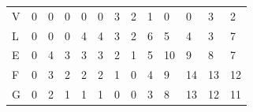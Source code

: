 \documentclass{bredelebeamer}
\begin{document}
\begin{frame}
\begin{table}[]
\begin{tabular}{lllllllllllll}
\multicolumn{1}{l|}{V}  & \multicolumn{1}{l|}{0} & \multicolumn{1}{l|}{0} & \multicolumn{1}{l|}{0} & \multicolumn{1}{l|}{0} & \multicolumn{1}{l|}{0}                         & \multicolumn{1}{l|}{\cellcolor[HTML]{EFEFEF}3} & \multicolumn{1}{l|}{\cellcolor[HTML]{3166FF}2} & \multicolumn{1}{l|}{1}                         & \multicolumn{1}{l|}{0}                          & \multicolumn{1}{l|}{0}                          & \multicolumn{1}{l|}{3}  & \multicolumn{1}{l|}{2}  \\ \cline{2-13} 
\multicolumn{1}{l|}{L}  & \multicolumn{1}{l|}{0} & \multicolumn{1}{l|}{0} & \multicolumn{1}{l|}{0} & \multicolumn{1}{l|}{4} & \multicolumn{1}{l|}{4}                         & \multicolumn{1}{l|}{3}                         & \multicolumn{1}{l|}{2}                         & \multicolumn{1}{l|}{\cellcolor[HTML]{3166FF}6} & \multicolumn{1}{l|}{5}                          & \multicolumn{1}{l|}{4}                          & \multicolumn{1}{l|}{3}  & \multicolumn{1}{l|}{7}  \\ \cline{2-13} 
\multicolumn{1}{l|}{E}  & \multicolumn{1}{l|}{0} & \multicolumn{1}{l|}{4} & \multicolumn{1}{l|}{3} & \multicolumn{1}{l|}{3} & \multicolumn{1}{l|}{3}                         & \multicolumn{1}{l|}{2}                         & \multicolumn{1}{l|}{1}                         & \multicolumn{1}{l|}{5}                         & \multicolumn{1}{l|}{\cellcolor[HTML]{3166FF}10} & \multicolumn{1}{l|}{9}                          & \multicolumn{1}{l|}{8}  & \multicolumn{1}{l|}{7}  \\ \cline{2-13} 
\multicolumn{1}{l|}{F}  & \multicolumn{1}{l|}{0} & \multicolumn{1}{l|}{3} & \multicolumn{1}{l|}{2} & \multicolumn{1}{l|}{2} & \multicolumn{1}{l|}{2}                         & \multicolumn{1}{l|}{1}                         & \multicolumn{1}{l|}{0}                         & \multicolumn{1}{l|}{4}                         & \multicolumn{1}{l|}{9}                          & \multicolumn{1}{l|}{\cellcolor[HTML]{3166FF}14} & \multicolumn{1}{l|}{13} & \multicolumn{1}{l|}{12} \\ \cline{2-13} 
\multicolumn{1}{l|}{G}  & \multicolumn{1}{l|}{0} & \multicolumn{1}{l|}{2} & \multicolumn{1}{l|}{1} & \multicolumn{1}{l|}{1} & \multicolumn{1}{l|}{1}                         & \multicolumn{1}{l|}{0}                         & \multicolumn{1}{l|}{0}                         & \multicolumn{1}{l|}{3}                         & \multicolumn{1}{l|}{8}                          & \multicolumn{1}{l|}{13}                         & \multicolumn{1}{l|}{12} & \multicolumn{1}{l|}{11} \\ \cline{2-13} 

\end{tabular}
\end{table}
\end{frame}
\end{document}
